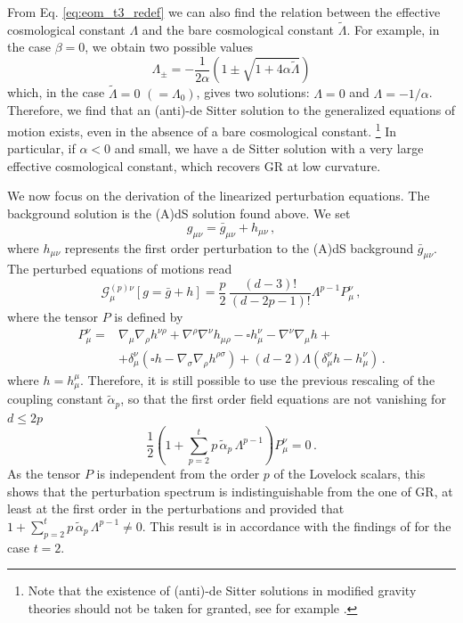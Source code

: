 \documentclass[aps,prd,preprint,nofootinbib]{revtex4-1}
\begin{document}
From Eq. \eqref{eq:eom_t3_redef} we can also find the relation between the effective cosmological constant $\Lambda$ and the bare cosmological constant $\tilde{\Lambda}$. For example, in the case $\beta=0$, we obtain two possible values
\begin{equation}
 \Lambda_{\pm} = -\frac{1}{2 \alpha} \left( 1 \pm \sqrt{1 + 4 \alpha \tilde{\Lambda}} \right)
\end{equation}
which, in the case $\tilde{\Lambda}=0$ $(=\Lambda_0)$, gives two solutions: $\Lambda=0$ and $\Lambda = -1/\alpha$. Therefore, we find that an (anti)-de Sitter solution to the generalized equations of motion exists, even in the absence of a bare cosmological constant. \footnote{Note that the existence of (anti)-de Sitter solutions in modified gravity theories should not be taken for granted, see for example \cite{Casa19}.} In particular, if $\alpha<0$ and small, we have a de Sitter solution with a very large effective cosmological constant, which recovers GR at low curvature.

We now focus on the derivation of the linearized perturbation equations. The background solution is the (A)dS solution found above. We set
\begin{equation}
g_{\mu \nu} = \bar{g}_{\mu \nu} + h_{\mu \nu}\,,
\end{equation}
where $h_{\mu \nu}$ represents the first order perturbation to the (A)dS background $\bar{g}_{\mu \nu}$. The perturbed equations of motions read
\begin{equation}
\mathcal{G}_{\mu}^{(p)\nu} \left[g= \bar{g} + h \right] =  \frac{p}{2} \, \frac{(d-3)!}{(d-2p-1)!} \Lambda^{p-1} P_{\mu}^{\nu} \, ,
\end{equation}{}
where the tensor $P$ is defined by
\begin{align}
P^{\nu}_{\mu} =&\nabla_\mu \nabla_\rho h^{\nu \rho} + \nabla^\rho \nabla^\nu h_{\mu\rho} -\square h^\nu_\mu -\nabla^\nu\nabla_\mu h + \nonumber\\
&+\delta_\mu^\nu \left(\square h - \nabla_\sigma \nabla_\rho h^{\rho\sigma}\right) + (d-2) \Lambda \left(\delta_\mu^\nu h - h^\nu_\mu\right) \,.
\end{align}
where $h=h^{\mu}_{\mu}$.
Therefore, it is still possible to use the previous rescaling of the coupling constant $\tilde{\alpha}_p$, so that the first order field equations are not vanishing for $d \leq 2p$
\begin{equation}
\frac{1}{2} \left( 1 + \sum_{p=2}^t p \, \tilde{\alpha}_p \, \Lambda^{p-1} \right) P_{\mu}^{\nu}=0 \, .
\end{equation}
As the tensor $P$ is independent from the order $p$ of the Lovelock scalars,
this shows that the perturbation spectrum is indistinguishable from the one of GR, at least at the first order in the perturbations and provided that $1 + \sum_{p=2}^t p \,  \tilde{\alpha}_p \, \Lambda^{p-1} \neq 0$. This result is in accordance with the findings of \cite{Glavan:2019inb} for the case $t=2$. 
\end{document}
